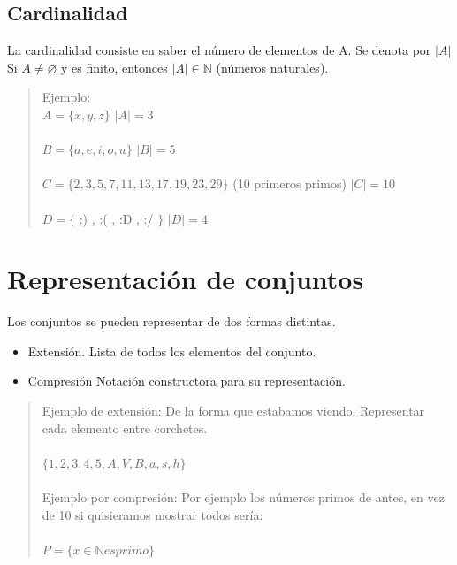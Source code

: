 \documentclass{article}
\begin{document}
\subsection{Cardinalidad}
La cardinalidad consiste en saber el número de elementos de A. Se denota por $|A|$
 Si $A \neq \varnothing$ y es finito, entonces $|A| \in \mathbb{N}$ (números naturales).

 \begin{quote}
    Ejemplo:\\

    $A = \{x,y,z\}$   $|A| = 3$ \\\\
    $B = \{a,e,i,o,u\}$   $|B| = 5$ \\\\
    $C = \{2,3,5,7,11,13,17,19,23,29\}$ (10 primeros primos) $|C| = 10$\\\\
    $D = \{$ :) , :( , :D , :/ $\}$   $|D| = 4$
 \end{quote}

\section{Representación de conjuntos}

Los conjuntos se pueden representar de dos formas distintas.

\begin{itemize}
    \item Extensión. Lista de todos los elementos del conjunto.
    \item Compresión Notación constructora para su representación.
\end{itemize}

\begin{quote}
    Ejemplo de extensión:
        De la forma que estabamos viendo. Representar cada elemento entre
        corchetes.\\\\
        $\{1,2,3,4,5,A,V,B,a,s,h\}$\\\\
    Ejemplo por compresión:
        Por ejemplo los números primos de antes, en vez de 10 si quisieramos
        mostrar todos sería:\\\\
        $P = \{x \in \mathbb{N} es primo\}$
\end{quote}
\end{document}

